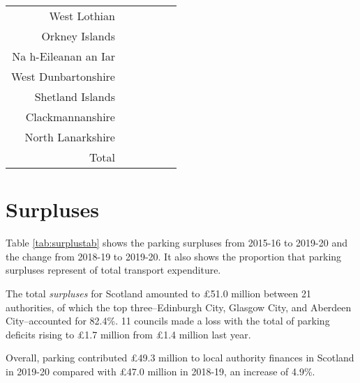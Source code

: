 \documentclass[
  12pt,
]{article}
\begin{document}
\begin{longtable}[t]{rrrrrr}
West Lothian & \cellcolor{white}{} & \cellcolor{white}{} & \cellcolor{white}{} & \cellcolor{white}{} & \cellcolor{white}{}\\
Orkney Islands & \cellcolor{white}{ 115.3\%} & \cellcolor{white}{ 121.8\%} & \cellcolor{white}{  89.9\%} & \cellcolor{white}{  90.7\%} & \cellcolor{white}{  89.9\%}\\
Na h-Eileanan an Iar & \cellcolor{white}{ 251.4\%} & \cellcolor{white}{ 283.3\%} & \cellcolor{white}{ 276.6\%} & \cellcolor{white}{ 155.4\%} & \cellcolor{white}{ 166.2\%}\\
West Dunbartonshire & \cellcolor{white}{} & \cellcolor{white}{} & \cellcolor{white}{} & \cellcolor{white}{} & \cellcolor{white}{}\\
Shetland Islands & \cellcolor{white}{  98.6\%} & \cellcolor{white}{ 133.3\%} & \cellcolor{white}{  85.7\%} & \cellcolor{white}{ 253.8\%} & \cellcolor{white}{ 106.6\%}\\
Clackmannanshire & \cellcolor{white}{ 657.1\%} & \cellcolor{white}{} & \cellcolor{white}{} & \cellcolor{white}{ 130.3\%} & \cellcolor{white}{ 147.4\%}\\
North Lanarkshire & \cellcolor{white}{} & \cellcolor{white}{} & \cellcolor{white}{} & \cellcolor{white}{} & \cellcolor{white}{}\\
\midrule
Total & \cellcolor{white}{  50.9\%} & \cellcolor{white}{  48.4\%} & \cellcolor{white}{  49.5\%} & \cellcolor{white}{  47.0\%} & \cellcolor{white}{  46.9\%}\\*
\end{longtable}
\endgroup{}

\newpage

\hypertarget{surpluses}{%
\section{Surpluses}\label{surpluses}}

Table \ref{tab:surplustab} shows the parking surpluses from 2015-16 to 2019-20 and the change from 2018-19 to 2019-20. It also shows the proportion that parking surpluses represent of total transport expenditure.

The total \emph{surpluses} for Scotland amounted to £51.0 million between 21 authorities, of which the top three--Edinburgh City, Glasgow City, and Aberdeen City--accounted for 82.4\%. 11 councils made a loss with the total of parking deficits rising to £1.7 million from £1.4 million last year.

Overall, parking contributed £49.3 million to local authority finances in Scotland in 2019-20 compared with £47.0 million in 2018-19, an increase of 4.9\%.
\end{document}
